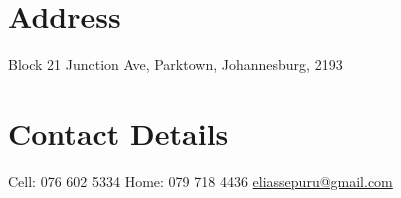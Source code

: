 \documentclass[]{friggeri-cv}
\begin{document}
      {}
      

\begin{aside}


 \vspace{2.2cm}
  \section{Address}
  
   Block 21 Junction Ave,
   Parktown,
   Johannesburg,
   2193
    ~
  \section{Contact Details}
    Cell: 076 602 5334
    Home: 079 718 4436
    \href{mailto:eliassepuru@gmail.com}{{eliassepuru@gmail.com}}
    ~

\end{aside}
\end{document}
